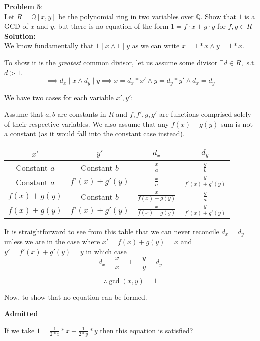 \documentclass[11pt]{article}
\newcommand{\prob}[3]{\begin{flushleft}
        \textbf{Problem #1}: \\
        #2 
		\textbf{Solution:} 
		#3

\end{flushleft}}
\newcommand{\admit}{
  \begin{flushright}
    \textbf{Admitted}
  \end{flushright}
}
\begin{document}
\prob{5}{
  Let $R = \mathbb{Q}[x,y]$ be the polynomial ring in two variables over $\mathbb{Q}$. Show that $1$ is a GCD of $x$ and $y$,
  but there is no equation of the form $1 = f \cdot x + g \cdot y$ for $f, g \in R$ \\
}{ \\
  We know fundamentally that $1 \mid x \land 1 \mid y$ as we can write $x = 1 * x \land y = 1 * x$.

  To show it is the \emph{greatest} common divisor, let us assume some divisor $\exists d \in R,$ s.t. $d > 1$.
  $$\implies d_x \mid x \land d_y \mid y \implies x = d_x * x' \land y = d_y * y' \land d_x = d_y$$

  We have two cases for each variable $x', y'$:

  Assume that $a,b$ are constants in $R$ and $f, f', g, g'$ are functions comprised solely of their respective variables.
  We also assume that any $f(x) + g(y)$ sum is not a constant (as it would fall into the constant case instead).

  \begin{center}
    \begin{tabular}{| c | c | c | c |} \hline
      $x'$          & $y'$            & $d_x$                   & $d_y$                     \\ \hline
      Constant $a$  & Constant $b$    & $\frac{x}{a}$           & $\frac{y}{b}$             \\ \hline
      Constant $a$  & $f'(x) + g'(y)$ & $\frac{x}{a}$           & $\frac{y}{f'(x) + g'(y)}$ \\ \hline
      $f(x) + g(y)$ & Constant $b$    & $\frac{x}{f(x) + g(y)}$ & $\frac{y}{a}$             \\ \hline
      $f(x) + g(y)$ & $f'(x) + g'(y)$ & $\frac{x}{f(x) + g(y)}$ & $\frac{y}{f'(x) + g'(y)}$ \\ \hline
    \end{tabular}
  \end{center}

  It is straightforward to see from this table that we can never reconcile $d_x = d_y$ unless we are in the case where $x' = f(x) + g(y) = x$ and $y' = f'(x) + g'(y) = y$ in which case
  $$d_x = \frac{x}{x} = 1 = \frac{y}{y} = d_y$$

  $$\therefore \gcd(x, y) = 1$$

  Now, to show that no equation can be formed.

  \admit

  If we take $1 = \frac{1}{2*x} * x + \frac{1}{2 * y} * y$ then this equation is satisfied?
}
\end{document}

